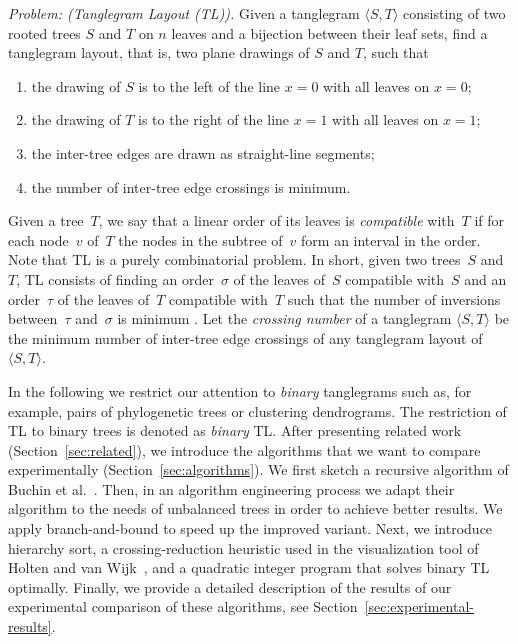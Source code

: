 \documentclass[runningheads,a4paper]{llncs}
\newcommand{\ttree}[1]{\ensuremath{\langle #1 \rangle}}
\begin{document}
\noindent\emph{Problem: (Tanglegram Layout (TL)).}
  Given a tanglegram \ttree{S,T} consisting of two rooted trees $S$
  and $T$ on $n$ leaves and a bijection between their leaf sets, find a
  tanglegram layout, that is, two plane drawings of $S$ and $T$, such that
  \begin{enumerate}
  \item the drawing of $S$ is to the left of the line $x=0$
    with all leaves on $x=0$;
  \item the drawing of $T$ is to the right of the line $x=1$
    with all leaves on $x=1$;
  \item the inter-tree edges are drawn as straight-line segments;
  \item the number of inter-tree edge crossings is minimum.
  \end{enumerate}
\smallskip

Given a tree~$T$, we say that a linear order of its leaves is
\emph{compatible} with~$T$ if for each node~$v$ of~$T$ the nodes in
the subtree of~$v$ form an interval in the order.  Note that TL is a
purely combinatorial problem.  In short, given two trees~$S$ and~$T$,
TL consists of finding an order~$\sigma$ of the leaves of~$S$
compatible with~$S$ and an order~$\tau$ of the leaves of~$T$
compatible with~$T$ such that the number of inversions between~$\tau$
and~$\sigma$ is minimum \cite{fkp-ctvcm-05,bbbnow-dbtha-08}.  Let the
\emph{crossing number} of a tanglegram \ttree{S,T} be the minimum
number of inter-tree edge crossings of any tanglegram layout of
\ttree{S,T}.

In the following we restrict our attention to \emph{binary}
tanglegrams such as, for example, pairs of phylogenetic trees or
clustering dendrograms. The restriction of TL to binary trees is
denoted as \emph{binary} TL.  After presenting related work
(Section~\ref{sec:related}), we introduce the algorithms that we want
to compare experimentally (Section~\ref{sec:algorithms}).  We first
sketch a recursive algorithm of Buchin et al.~\cite{bbbnow-dbtha-08}.
Then, in an algorithm engineering process we adapt their algorithm to
the needs of unbalanced trees in order to achieve better results.  We
apply branch-and-bound to speed up the improved variant.  Next, we
introduce hierarchy sort, a crossing-reduction heuristic used in the
visualization tool of Holten and van Wijk~\cite{hw-vchod-08}, and a
quadratic integer program that solves binary TL optimally.  Finally,
we provide a detailed description of the results of our experimental
comparison of these algorithms, see
Section~\ref{sec:experimental-results}.
\end{document}

